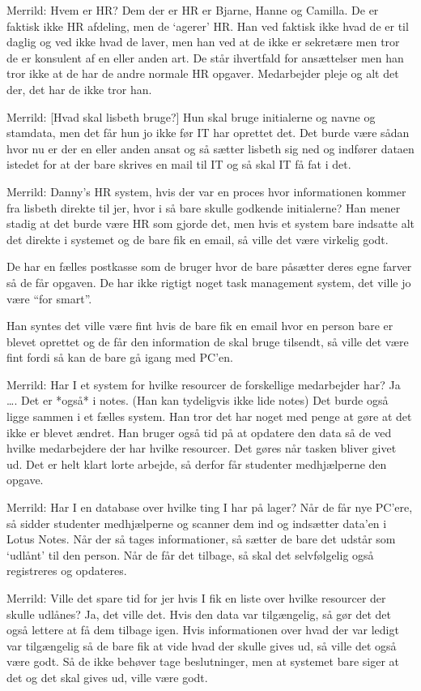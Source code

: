 \begin{linenumbers*}
Merrild: Hvem er HR?
Dem der er HR er Bjarne, Hanne og Camilla. De er faktisk ikke HR afdeling, men de ‘agerer’ HR. Han ved faktisk ikke hvad de er til daglig og ved ikke hvad de laver, men han ved at de ikke er sekretære men tror de er konsulent af en eller anden art. De står ihvertfald for ansættelser men han tror ikke at de har de andre normale HR opgaver. Medarbejder pleje og alt det der, det har de ikke tror han. 

Merrild: [Hvad skal lisbeth bruge?]
Hun skal bruge initialerne og navne og stamdata, men det får hun jo ikke før IT har oprettet det. 
Det burde være sådan hvor nu er der en eller anden ansat og så sætter lisbeth sig ned og indfører dataen istedet for at der bare skrives en mail til IT og så skal IT få fat i det. 

Merrild: Danny’s HR system, hvis der var en proces hvor informationen kommer fra lisbeth direkte til jer, hvor i så bare skulle godkende initialerne?
Han mener stadig at det burde være HR som gjorde det, men hvis et system bare indsatte alt det direkte i systemet og de bare fik en email, så ville det være virkelig godt.

De har en fælles postkasse som de bruger hvor de bare påsætter deres egne farver så de får opgaven. De har ikke rigtigt noget task management system, det ville jo være “for smart”. 

Han syntes det ville være fint hvis de bare fik en email hvor en person bare er blevet oprettet og de får den information de skal bruge tilsendt, så ville det være fint fordi så kan de bare gå igang med PC’en.

Merrild: Har I et system for hvilke resourcer de forskellige medarbejder har?
Ja …. Det er *også* i notes. (Han kan tydeligvis ikke lide notes) Det burde også ligge sammen i et fælles system. Han tror det har noget med penge at gøre at det ikke er blevet ændret. 
Han bruger også tid på at opdatere den data så de ved hvilke medarbejdere der har hvilke resourcer. Det gøres når tasken bliver givet ud. Det er helt klart lorte arbejde, så derfor får studenter medhjælperne den opgave. 

Merrild: Har I en database over hvilke ting I har på lager?
Når de får nye PC’ere, så sidder studenter medhjælperne og scanner dem ind og indsætter data’en i Lotus Notes. Når der så tages informationer, så sætter de bare det udstår som ‘udlånt’ til den person. Når de får det tilbage, så skal det selvfølgelig også registreres og opdateres. 

Merrild: Ville det spare tid for jer hvis I fik en liste over hvilke resourcer der skulle udlånes?
Ja, det ville det. Hvis den data var tilgængelig, så gør det det også lettere at få dem tilbage igen. Hvis informationen over hvad der var ledigt var tilgængelig så de bare fik at vide hvad der skulle gives ud, så ville det også være godt. Så de ikke behøver tage beslutninger, men at systemet bare siger at det og det skal gives ud, ville være godt.


\end{linenumbers*}
